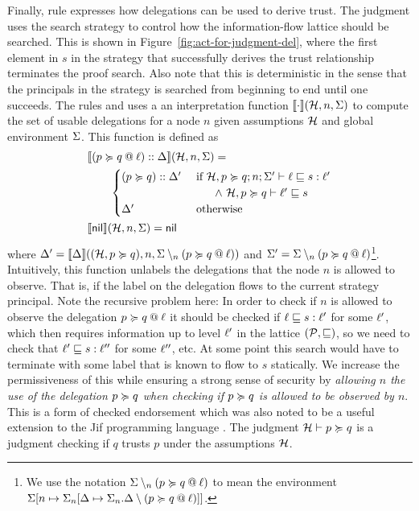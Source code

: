 Finally, rule  expresses how delegations can be used to derive trust. The judgment uses the search strategy to control how the information-flow lattice should be searched. This is shown in Figure~\ref{fig:act-for-judgment-del}, where the first element in $s$ in the strategy that successfully derives the trust relationship terminates the proof search. Also note that this is deterministic in the sense that the principals in the strategy is searched from beginning to end until one succeeds. The rules  and  uses a an interpretation function $\llbracket \cdot \rrbracket(\mathcal{H}, n, \Sigma)$ to compute the set of usable delegations for a node $n$ given assumptions $\mathcal{H}$ and global environment $\Sigma$. This function is defined as
\begin{align}\label{eq:interpret-del}
&\llbracket (\lb{\level}{p \actsfor q}) :: \scope \rrbracket(\Assumps, n, \env) = \\ \nonumber &\qquad  \begin{cases}
(p \actsfor q) :: \scope' & \text{ if } \flowstoquery{\Assumps, p \actsfor q; n; \env'}{\level}{s}{\level'} \\ &\qquad \wedge\ \nopostflowstoquery{\Assumps, p \actsfor q}{\level'}{s} \\
\scope' & \text{ otherwise}
\end{cases}
\\ \nonumber
&\llbracket \nil \rrbracket(\Assumps, n, \env) = \nil
\end{align}
where $\Delta' = \llbracket \Delta \rrbracket((\mathcal{H}, p \succcurlyeq q), n, \Sigma \setminus_n (p \succcurlyeq q \mathbin{@} \ell))$ and $\Sigma' = \Sigma \setminus_n (p \succcurlyeq q \mathbin{@} \ell)$\footnote{We use the notation $\Sigma \setminus_n (p \succcurlyeq q \mathbin{@} \ell)$ to mean the environment $\Sigma \lbrack n \mapsto \Sigma_n \lbrack \Delta \mapsto \Sigma_n.\Delta \setminus (p \succcurlyeq q \mathbin{@} \ell) \rbrack \rbrack$.}. Intuitively, this function unlabels the delegations that the node $n$ is allowed to observe. That is, if the label on the delegation flows to the current strategy principal. Note the recursive problem here: In order to check if $n$ is allowed to observe the delegation $p \succcurlyeq q \mathbin{@} \ell$ it should be checked if $\ell \sqsubseteq s : \ell'$ for some $\ell'$, which then requires information up to level $\ell'$ in the lattice $(\mathcal{P}, \sqsubseteq)$, so we need to check that $\ell' \sqsubseteq s : \ell''$ for some $\ell''$, etc. At some point this search would have to terminate with some label that is known to flow to $s$ statically. We increase the permissiveness of this while ensuring a strong sense of security by \emph{allowing $n$ the use of the delegation $p \succcurlyeq q$ when checking if $p \succcurlyeq q$ is allowed to be observed by $n$}. This is a form of checked endorsement \cite{DBLP:journals/corr/abs-1107-5594} which was also noted to be a useful extension to the Jif programming language \cite{Chong:2007:SWA:1294261.1294265}. The judgment $\mathcal{H} \vdash p \succcurlyeq q$ is a judgment checking if $q$ trusts $p$ under the assumptions $\mathcal{H}$. 

